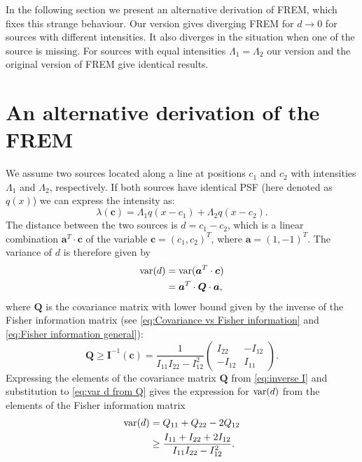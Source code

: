 In the following section we present an alternative derivation of FREM, which fixes this strange behaviour. Our version gives diverging FREM for $d\rightarrow0$ for sources with different intensities. It also diverges in the situation when one of the source is missing. For sources with equal intensities $\Lambda_1=\Lambda_2$ our version and the original version of FREM give identical results. 


\section{An alternative derivation of the FREM\label{sub:An-alternative-derivation-FREM}} 
 
We assume two sources located along a line at positions $c_1$ and $c_2$ with intensities $\Lambda_1$ and $\Lambda_2$, respectively. If both sources have identical PSF (here denoted as $q(x)$) we can express the intensity as:
%
\begin{equation}
	\lambda(\bm{c})=\Lambda_1q(x-c_1)+\Lambda_2q(x-c_2).
	\label{eq:lambda}
\end{equation}
%
The distance between the two sources is $d=c_1-c_2$, which is a linear combination $\bm{a}^{T}\cdot\bm{c}$ of the variable $\bm{c}=(c_1,c_2)^{T}$, where $\bm{a}=(1,-1)^{T}$. The variance of $d$ is therefore given by 
%
\begin{alignat}{2}
	\mathrm{var}(d)
	&=\mathrm{var}(\bm{a}^{T}\cdot\bm{c})\nonumber\\
	&=\bm{a}^{T}\cdot\bm{Q}\cdot\bm{a},
	\label{eq:var d from Q}
\end{alignat}
%
where $\bm{Q}$ is the covariance matrix with lower bound given by the inverse of the Fisher information matrix (see \autoref{eq:Covariance vs Fisher information} and \autoref{eq:Fisher information general}):
%
\begin{equation}
	\bm{Q}\geq\bm{I}^{-1}(\bm{c})=\frac{1}{I_{11}I_{22}-I_{12}^2}\left(
	\begin{array}{cc}
		I_{22} & -I_{12}\\
		-I_{12} & I_{11}
	\end{array}\right).
	\label{eq:inverse I}
\end{equation}
%
Expressing the elements of the covariance matrix $\bm{Q}$ from \autoref{eq:inverse I} and substitution to \autoref{eq:var d from Q} gives the expression for $\mathrm{var}(d)$ from the elements of the Fisher information matrix
%
\begin{alignat}{2}
	\mathrm{var}(d)
	&=Q_{11}+Q_{22}-2Q_{12}\nonumber\\
	&\geq\frac{I_{11}+I_{22}+2I_{12}}{I_{11}I_{22}-I_{12}^2}.
	\label{eq:variance d alternative}
\end{alignat}

